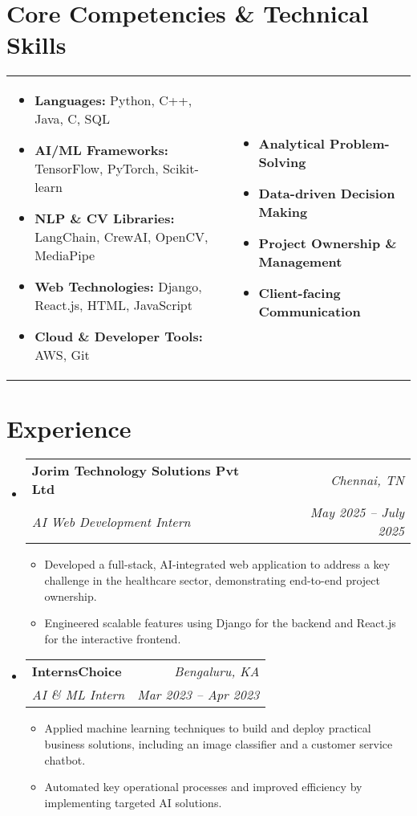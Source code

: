 \documentclass[letterpaper,10pt]{article}
\makeatletter
\newcommand{\resumeItem}[1]{\item\small{#1\vspace{-2pt}}}
\newcommand{\resumeSubheading}[4]{
  \vspace{-2pt}\item
    \begin{tabular*}{0.97\textwidth}[t]{l@{\extracolsep{\fill}}r}
      \textbf{#1} & \textit{\small#2} \\
      \textit{\small#3} & \textit{\small #4} \\
    \end{tabular*}\vspace{-5pt}
}
\newcommand{\resumeSubHeadingListStart}{\begin{itemize}[leftmargin=0.15in, label={}]}
\newcommand{\resumeSubHeadingListEnd}{\end{itemize}}
\newcommand{\resumeItemListStart}{\begin{itemize}[leftmargin=0.15in, itemsep=-3pt, topsep=0pt]}
\newcommand{\resumeItemListEnd}{\end{itemize}\vspace{-5pt}}
\makeatother
\begin{document}
\section{Core Competencies \& Technical Skills}
\begin{tabular*}{\textwidth}{@{}p{}p{}}
    \begin{itemize}[leftmargin=0.15in, label={$\bullet$}, itemsep=0pt]
        \item \textbf{Languages:} Python, C++, Java, C, SQL
        \item \textbf{AI/ML Frameworks:} TensorFlow, PyTorch, Scikit-learn
        \item \textbf{NLP \& CV Libraries:} LangChain, CrewAI, OpenCV, MediaPipe
        \item \textbf{Web Technologies:} Django, React.js, HTML, JavaScript
        \item\textbf{Cloud \& Developer Tools:} AWS, Git
    \end{itemize} &
    \begin{itemize}[leftmargin=0.15in, label={$\bullet$}, itemsep=0pt]
        \item \textbf{Analytical Problem-Solving}
        \item \textbf{Data-driven Decision Making}
        \item \textbf{Project Ownership \& Management}
        \item \textbf{Client-facing Communication}
    \end{itemize}
\end{tabular*}


\section{Experience}
\resumeSubHeadingListStart
    \resumeSubheading
    {Jorim Technology Solutions Pvt Ltd}{Chennai, TN}
    {AI Web Development Intern}{May 2025 -- July 2025}
    \resumeItemListStart
        \resumeItem{Developed a full-stack, AI-integrated web application to address a key challenge in the healthcare sector, demonstrating end-to-end project ownership.}
        \resumeItem{Engineered scalable features using Django for the backend and React.js for the interactive frontend.}
    \resumeItemListEnd

    \resumeSubheading
    {InternsChoice}{Bengaluru, KA}
    {AI \& ML Intern}{Mar 2023 -- Apr 2023}
    \resumeItemListStart
        \resumeItem{Applied machine learning techniques to build and deploy practical business solutions, including an image classifier and a customer service chatbot.}
        \resumeItem{Automated key operational processes and improved efficiency by implementing targeted AI solutions.}
    \resumeItemListEnd
\resumeSubHeadingListEnd
\end{document}
